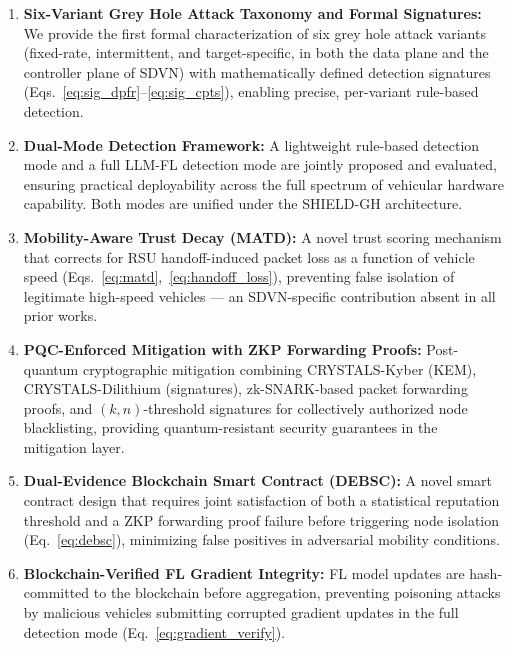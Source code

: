 \documentclass[12pt, a4paper]{report}
\begin{document}
\begin{enumerate}
  \item \textbf{Six-Variant Grey Hole Attack Taxonomy and Formal Signatures:}
  We provide the first formal characterization of six grey hole attack variants
  (fixed-rate, intermittent, and target-specific, in both the data plane and
  the controller plane of SDVN) with mathematically defined detection signatures
  (Eqs.~\eqref{eq:sig_dpfr}--\eqref{eq:sig_cpts}), enabling precise, per-variant
  rule-based detection.

  \item \textbf{Dual-Mode Detection Framework:}
  A lightweight rule-based detection mode and a full LLM-FL detection mode are
  jointly proposed and evaluated, ensuring practical deployability across the
  full spectrum of vehicular hardware capability. Both modes are unified under
  the SHIELD-GH architecture.

  \item \textbf{Mobility-Aware Trust Decay (MATD):}
  A novel trust scoring mechanism that corrects for RSU handoff-induced packet
  loss as a function of vehicle speed (Eqs.~\eqref{eq:matd},~\eqref{eq:handoff_loss}),
  preventing false isolation of legitimate high-speed vehicles — an SDVN-specific
  contribution absent in all prior works.

  \item \textbf{PQC-Enforced Mitigation with ZKP Forwarding Proofs:}
  Post-quantum cryptographic mitigation combining CRYSTALS-Kyber (KEM),
  CRYSTALS-Dilithium (signatures), zk-SNARK-based packet forwarding proofs,
  and $(k,n)$-threshold signatures for collectively authorized node blacklisting,
  providing quantum-resistant security guarantees in the mitigation layer.

  \item \textbf{Dual-Evidence Blockchain Smart Contract (DEBSC):}
  A novel smart contract design that requires joint satisfaction of both a
  statistical reputation threshold and a ZKP forwarding proof failure before
  triggering node isolation (Eq.~\eqref{eq:debsc}), minimizing false positives
  in adversarial mobility conditions.

  \item \textbf{Blockchain-Verified FL Gradient Integrity:}
  FL model updates are hash-committed to the blockchain before aggregation,
  preventing poisoning attacks by malicious vehicles submitting corrupted
  gradient updates in the full detection mode (Eq.~\eqref{eq:gradient_verify}).


\end{enumerate}
\end{document}
